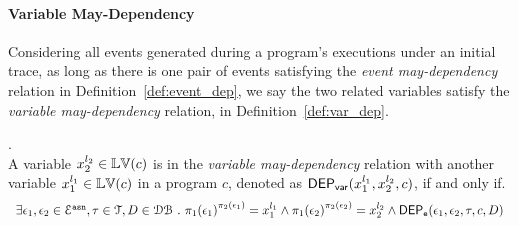 \paragraph*{Variable May-Dependency}
Considering 
all events generated during a program's executions
under an initial trace,
as long as there is one pair of events satisfying the \emph{event may-dependency} relation in Definition~\ref{def:event_dep}, 
 we say the two 
related
variables satisfy the \emph{variable may-dependency} relation, in Definition~\ref{def:var_dep}.
\begin{defn}.
 \label{def:var_dep}
 \\
 A variable ${x}_2^{l_2} \in \mathbb{LV}(c)$ is in the \emph{variable may-dependency} relation with another
 variable ${x}_1^{l_1} \in \mathbb{LV}(c)$ in a program ${c}$, denoted as 
 $\mathsf{DEP_{var}}({x}_1^{l_1}, {x}_2^{l_2}, {c})$, if and only if.
\[
 \begin{array}{l}
\exists \event_1, \event_2 \in \eventset^{\asn}, \trace \in \mathcal{T} , D \in \dbdom \st
\pi_{1}{(\event_1)}^{\pi_{2}{(\event_1)}} = {x}_1^{l_1}
\land
\pi_{1}{(\event_2)}^{\pi_{2}{(\event_2)}} = {x}_2^{l_2}%
\land 
\eventdep(\event_1, \event_2, \trace, c, D) 
 \end{array}
\] %
 \end{defn}

